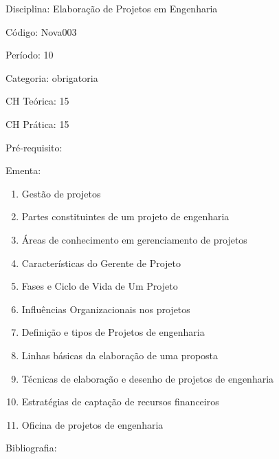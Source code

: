 \documentclass[12pt,a4paper,twoside]{report}
\begin{document}
Disciplina: Elaboração de Projetos em Engenharia

Código: Nova003

Período: 10

Categoria: obrigatoria

CH Teórica: 15

CH Prática: 15




Pré-requisito:
\begin{enumerate}
\end{enumerate}

Ementa:
\begin{enumerate}
\item Gestão de projetos
\item Partes constituintes de um projeto de engenharia
\item Áreas de conhecimento em gerenciamento de projetos
\item Características do Gerente de Projeto
\item Fases e Ciclo de Vida de Um Projeto
\item Influências Organizacionais nos projetos
\item Definição e tipos de Projetos de engenharia
\item Linhas básicas da elaboração de uma proposta
\item Técnicas de elaboração e desenho de projetos de engenharia
\item Estratégias de captação de recursos financeiros
\item Oficina de projetos de engenharia
\end{enumerate}



Bibliografia:
\end{document}
